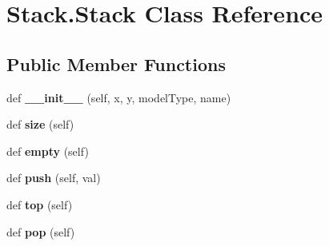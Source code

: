\hypertarget{class_stack_1_1_stack}{}\section{Stack.\+Stack Class Reference}
\label{class_stack_1_1_stack}
\subsection*{Public Member Functions}
\begin{DoxyCompactItemize}
\item 
\mbox{\label{class_stack_1_1_stack_a7f70c39c7407c4939620daec869a821f}} 
def {\bfseries \+\_\+\+\_\+init\+\_\+\+\_\+} (self, x, y, model\+Type, name)
\item 
\mbox{\label{class_stack_1_1_stack_ad9471af89d6d83d7bc042b75bd6c1995}} 
def {\bfseries size} (self)
\item 
\mbox{\label{class_stack_1_1_stack_a9067f94dbf1a0d820abd4eb0339d6326}} 
def {\bfseries empty} (self)
\item 
\mbox{\label{class_stack_1_1_stack_a88abef205b55d9d26ef7958d61c4c313}} 
def {\bfseries push} (self, val)
\item 
\mbox{\label{class_stack_1_1_stack_a5f953865bd581272431c9a1664aa43ec}} 
def {\bfseries top} (self)
\item 
\mbox{\label{class_stack_1_1_stack_a3bc727e674359c79cfd00996895ffe4e}} 
def {\bfseries pop} (self)
\end{DoxyCompactItemize}

